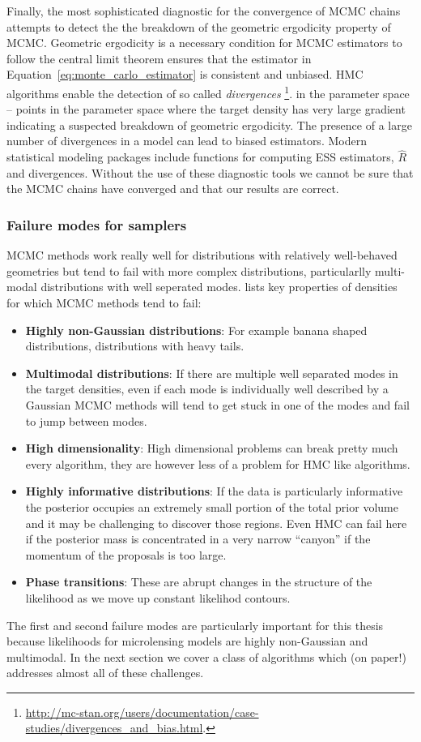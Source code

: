 \documentclass[12pt,dvipsnames]{report}
\begin{document}
Finally, the most sophisticated diagnostic for the convergence of MCMC chains
attempts to detect the the breakdown of the geometric ergodicity property of
MCMC. Geometric ergodicity is a necessary condition for MCMC estimators to
follow the central limit theorem ensures that the estimator in 
Equation~\ref{eq:monte_carlo_estimator} is consistent and unbiased.
HMC algorithms enable the detection of so called
\textsl{divergences} 
\footnote{\url{http://mc-stan.org/users/documentation/case-studies/divergences_and_bias.html}.}.
 in the parameter space -- points in the parameter space 
where the target density has very large gradient indicating 
a suspected  breakdown of geometric ergodicity.
The presence of a large number of divergences in a model can lead to 
biased estimators. 
Modern statistical modeling packages include functions for computing ESS 
estimators,  $\hat R$ and divergences. Without the use of these diagnostic 
tools we cannot be sure that the MCMC chains have converged and that our results 
are correct.



\subsubsection{Failure modes for samplers}
MCMC methods work really well for distributions with relatively well-behaved 
geometries but tend to fail with more complex distributions, particularlly 
multi-modal distributions with well seperated modes. 
 \citet{arXiv:2101.09675} lists 
key properties of densities for which MCMC methods tend to fail:
\begin{itemize}
    \item \textbf{Highly non-Gaussian distributions}: For example banana shaped
    distributions, distributions with heavy tails.
    \item \textbf{Multimodal distributions}: If there are multiple well 
    separated  modes in the target densities, even if each mode is individually 
    well described by a Gaussian MCMC methods will tend to get stuck in one of
    the modes and fail to jump between modes.
    \item \textbf{High dimensionality}: High dimensional problems can break pretty 
    much every algorithm, they are however less of a problem for HMC like algorithms.
    \item \textbf{Highly informative distributions}: If the data is particularly 
    informative the posterior occupies an extremely small portion of the total 
    prior volume and it may be challenging to discover those regions. Even HMC 
    can fail here if the posterior mass is concentrated  in a very narrow 
    ``canyon'' if the momentum of the proposals is too large.
    \item \textbf{Phase transitions}: These are abrupt changes in the structure 
    of the likelihood as we move up constant likelihod contours.
\end{itemize}
The first and second failure modes are particularly important for this thesis 
because likelihoods for microlensing models are highly non-Gaussian and 
multimodal. In the next section we cover a class of algorithms which (on paper!)
addresses almost all of these challenges.
\end{document}
